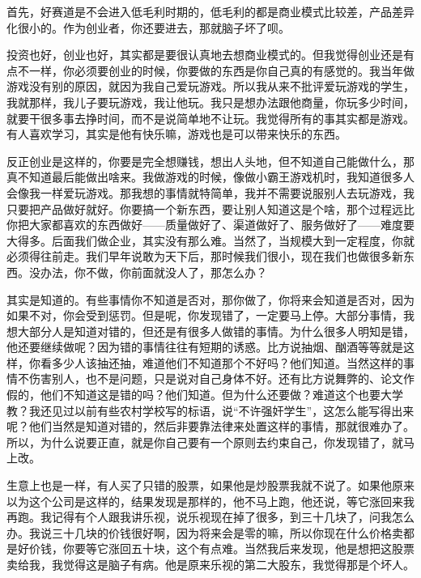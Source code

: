 

首先，好赛道是不会进入低毛利时期的，低毛利的都是商业模式比较差，产品差异化很小的。作为创业者，你还要进去，那就脑子坏了呗。

投资也好，创业也好，其实都是要很认真地去想商业模式的。但我觉得创业还是有点不一样，你必须要创业的时候，你要做的东西是你自己真的有感觉的。我当年做游戏没有别的原因，就因为我自己爱玩游戏。所以我从来不批评爱玩游戏的学生，我就那样，我儿子要玩游戏，我让他玩。我只是想办法跟他商量，你玩多少时间，就要干很多事去挣时间，而不是说简单地不让玩。我觉得所有的事其实都是游戏。有人喜欢学习，其实是他有快乐嘛，游戏也是可以带来快乐的东西。

反正创业是这样的，你要是完全想赚钱，想出人头地，但不知道自己能做什么，那真不知道最后能做出啥来。我做游戏的时候，像做小霸王游戏机时，我知道很多人会像我一样爱玩游戏。那我想的事情就特简单，我并不需要说服别人去玩游戏，我只要把产品做好就好。你要搞一个新东西，要让别人知道这是个啥，那个过程远比你把大家都喜欢的东西做好——质量做好了、渠道做好了、服务做好了——难度要大得多。后面我们做企业，其实没有那么难。当然了，当规模大到一定程度，你就必须得往前走。我们早年说敢为天下后，那时候我们很小，现在我们也做很多新东西。没办法，你不做，你前面就没人了，那怎么办？



其实是知道的。有些事情你不知道是否对，那你做了，你将来会知道是否对，因为如果不对，你会受到惩罚。但是呢，你发现错了，一定要马上停。大部分事情，我想大部分人是知道对错的，但还是有很多人做错的事情。为什么很多人明知是错，他还要继续做呢？因为错的事情往往有短期的诱惑。比方说抽烟、酗酒等等就是这样，你看多少人该抽还抽，难道他们不知道那个不好吗？他们知道。当然这样的事情不伤害别人，也不是问题，只是说对自己身体不好。还有比方说舞弊的、论文作假的，他们不知道这是错的吗？他们知道。但为什么还要做？难道这个也要大学教？我还见过以前有些农村学校写的标语，说“不许强奸学生”，这怎么能写得出来呢？他们当然是知道对错的，然后非要靠法律来处置这样的事情，那就很难办了。所以，为什么说要正直，就是你自己要有一个原则去约束自己，你发现错了，就马上改。

生意上也是一样，有人买了只错的股票，如果他是炒股票我就不说了。如果他原来以为这个公司是这样的，结果发现是那样的，他不马上跑，他还说，等它涨回来我再跑。我记得有个人跟我讲乐视，说乐视现在掉了很多，到三十几块了，问我怎么办。我说三十几块的价钱很好啊，因为将来会是零的嘛，所以你现在什么价格卖都是好价钱，你要等它涨回五十块，这个有点难。当然我后来发现，他是想把这股票卖给我，我觉得这是脑子有病。他是原来乐视的第二大股东，我觉得那是个坏人。

